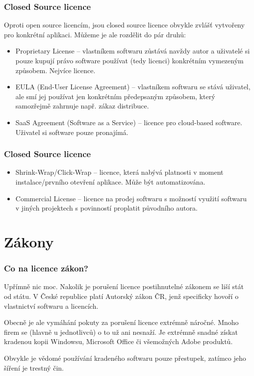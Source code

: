 \documentclass[aspectratio=169,11pt,svgnames,handout]{beamer}
\begin{document}
\begin{frame}
\frametitle{Closed Source licence}
Oproti open source licencím, jsou closed source licence obvykle zvlášť
vytvořeny pro konkrétní aplikaci. Můžeme je ale rozdělit do pár druhů:
\pause
\begin{itemize}[label=\textbullet]
  \item \alert{Proprietary License} -- vlastníkem softwaru zůstává navždy autor
    a uživatelé si pouze kupují právo software používat (tedy licenci)
    konkrétním vymezeným způsobem. Nejvíce  licence.
    \pause
  \item \alert{EULA} (End-User License Agreement) -- vlastníkem softwaru se
    stává uživatel, ale smí jej používat jen konkrétním předepsaným způsobem,
    který samozřejmě zahrnuje např. zákaz distribuce.
    \pause
  \item \alert{SaaS Agreement} (Software as a Service) -- licence pro
    cloud-based software. Uživatel si software pouze pronajímá.
\end{itemize}
\end{frame}

\begin{frame}
\frametitle{Closed Source licence}
\begin{itemize}[label=\textbullet]
  \item \alert{Shrink-Wrap/Click-Wrap} -- licence, která nabývá platnosti v
    moment instalace/prvního otevření aplikace. Může být automatizována.
    \pause
  \item \alert{Commercial License} -- licence na prodej softwaru s možností
    využití softwaru v jiných projektech s povinností proplatit původního
    autora.
\end{itemize}
\end{frame}

\section{Zákony}
\label{sec:zakony}

\begin{frame}
\frametitle{Co na licence zákon?}
Upřímně nic moc. Nakolik je porušení licence postihnutelné zákonem se liší
stát od státu. V České republice platí \alert{Autorský zákon ČR}, jenž
specificky hovoří o vlastnictví softwaru a licencích.
\pause

Obecně je ale vymáhání pokuty za porušení licence extrémně náročné. Mnoho
firem se (hlavně u jednotlivců) o to už ani nesnaží. Je extrémně snadné získat
kradenou kopii Windowsu, Microsoft Office či všemožných Adobe produktů.
\pause

Obvykle je vědomé používání kradeného softwaru pouze přestupek, zatímco jeho
šíření je trestný čin.
\end{frame}
\end{document}
